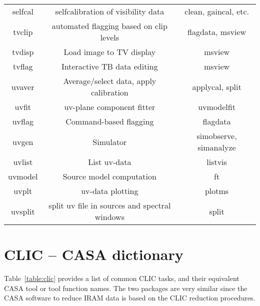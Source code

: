 \begin{table}[ht]
\begin{center}
\begin{tabular}{|c|c|c|}
  selfcal &  selfcalibration of visibility data  & clean, gaincal, etc. \\
  tvclip  &  automated flagging based on clip levels  & flagdata, msview \\
  tvdisp  &  Load image to TV display      &  msview  \\
  tvflag  &  Interactive TB data editing   &  msview  \\
  uvaver  &  Average/select data, apply calibration  &  applycal, split  \\
  uvfit   &  uv-plane component fitter     &  uvmodelfit  \\
  uvflag  &  Command-based flagging        &  flagdata  \\
  uvgen   &  Simulator                     &  simobserve, simanalyze \\
  uvlist  &  List uv-data                  &  listvis  \\
  uvmodel &  Source model computation      &  ft \\
  uvplt   &  uv-data plotting              &  plotms\\
  uvsplit &  split uv file in sources and spectral windows &  split  \\
\hline
\end{tabular}
\end{center}
\end{table}


\section{CLIC -- CASA dictionary}
\label{section:dict.clic}

Table~\ref{table:clic} provides a list of common CLIC tasks, and their
equivalent CASA tool or tool function names. The two packages are
very similar since the CASA software to reduce IRAM data is based
on the CLIC reduction procedures.

